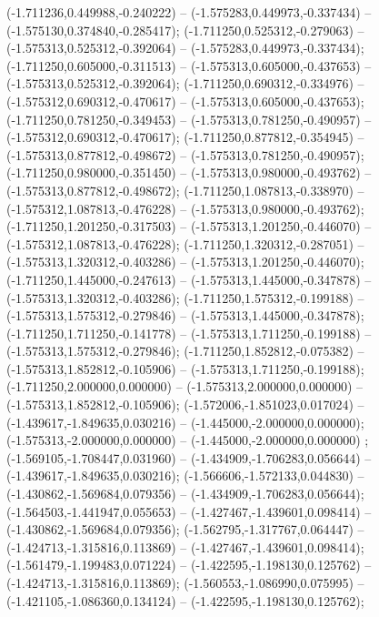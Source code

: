  (-1.711236,0.449988,-0.240222) -- (-1.575283,0.449973,-0.337434) -- (-1.575130,0.374840,-0.285417);
 (-1.711250,0.525312,-0.279063) -- (-1.575313,0.525312,-0.392064) -- (-1.575283,0.449973,-0.337434);
 (-1.711250,0.605000,-0.311513) -- (-1.575313,0.605000,-0.437653) -- (-1.575313,0.525312,-0.392064);
 (-1.711250,0.690312,-0.334976) -- (-1.575312,0.690312,-0.470617) -- (-1.575313,0.605000,-0.437653);
 (-1.711250,0.781250,-0.349453) -- (-1.575313,0.781250,-0.490957) -- (-1.575312,0.690312,-0.470617);
 (-1.711250,0.877812,-0.354945) -- (-1.575313,0.877812,-0.498672) -- (-1.575313,0.781250,-0.490957);
 (-1.711250,0.980000,-0.351450) -- (-1.575313,0.980000,-0.493762) -- (-1.575313,0.877812,-0.498672);
 (-1.711250,1.087813,-0.338970) -- (-1.575312,1.087813,-0.476228) -- (-1.575313,0.980000,-0.493762);
 (-1.711250,1.201250,-0.317503) -- (-1.575313,1.201250,-0.446070) -- (-1.575312,1.087813,-0.476228);
 (-1.711250,1.320312,-0.287051) -- (-1.575313,1.320312,-0.403286) -- (-1.575313,1.201250,-0.446070);
 (-1.711250,1.445000,-0.247613) -- (-1.575313,1.445000,-0.347878) -- (-1.575313,1.320312,-0.403286);
 (-1.711250,1.575312,-0.199188) -- (-1.575313,1.575312,-0.279846) -- (-1.575313,1.445000,-0.347878);
 (-1.711250,1.711250,-0.141778) -- (-1.575313,1.711250,-0.199188) -- (-1.575313,1.575312,-0.279846);
 (-1.711250,1.852812,-0.075382) -- (-1.575313,1.852812,-0.105906) -- (-1.575313,1.711250,-0.199188);
 (-1.711250,2.000000,0.000000) -- (-1.575313,2.000000,0.000000) -- (-1.575313,1.852812,-0.105906);
 (-1.572006,-1.851023,0.017024) -- (-1.439617,-1.849635,0.030216) -- (-1.445000,-2.000000,0.000000);
 (-1.575313,-2.000000,0.000000) -- (-1.445000,-2.000000,0.000000) ;
 (-1.569105,-1.708447,0.031960) -- (-1.434909,-1.706283,0.056644) -- (-1.439617,-1.849635,0.030216);
 (-1.566606,-1.572133,0.044830) -- (-1.430862,-1.569684,0.079356) -- (-1.434909,-1.706283,0.056644);
 (-1.564503,-1.441947,0.055653) -- (-1.427467,-1.439601,0.098414) -- (-1.430862,-1.569684,0.079356);
 (-1.562795,-1.317767,0.064447) -- (-1.424713,-1.315816,0.113869) -- (-1.427467,-1.439601,0.098414);
 (-1.561479,-1.199483,0.071224) -- (-1.422595,-1.198130,0.125762) -- (-1.424713,-1.315816,0.113869);
 (-1.560553,-1.086990,0.075995) -- (-1.421105,-1.086360,0.134124) -- (-1.422595,-1.198130,0.125762);
